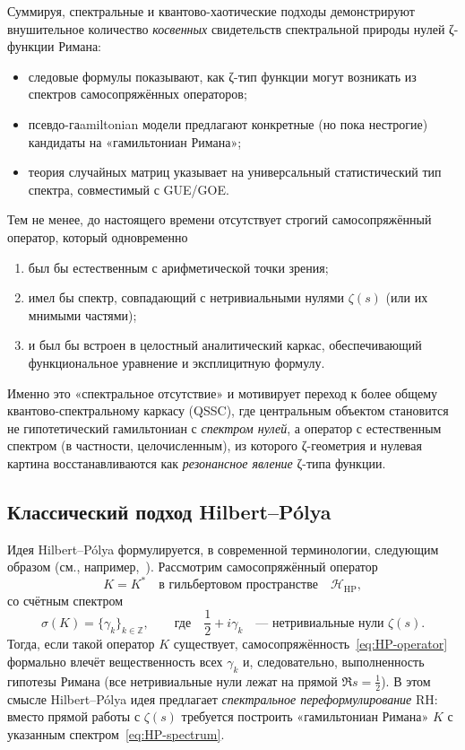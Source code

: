 \documentclass{article}
\numberwithin{equation}{section}
\theoremstyle{plain}
\theoremstyle{definition}
\theoremstyle{remark}
\begin{document}
\medskip

\noindent
Суммируя, спектральные и квантово-хаотические подходы демонстрируют внушительное количество \emph{косвенных} свидетельств спектральной природы нулей ζ-функции Римана:
\begin{itemize}
  \item следовые формулы показывают, как ζ-тип функции могут возникать из спектров самосопряжённых операторов;
  \item псевдо-гаamiltonian модели предлагают конкретные (но пока нестрогие) кандидаты на «гамильтониан Римана»;
  \item теория случайных матриц указывает на универсальный статистический тип спектра, совместимый с GUE/GOE.
\end{itemize}
Тем не менее, до настоящего времени отсутствует строгий самосопряжённый оператор, который одновременно
\begin{enumerate}[label=(\roman*), leftmargin=2.3em]
  \item был бы естественным с арифметической точки зрения;
  \item имел бы спектр, совпадающий с нетривиальными нулями $\zeta(s)$ (или их мнимыми частями);
  \item и был бы встроен в целостный аналитический каркас, обеспечивающий функциональное уравнение и эксплицитную формулу.
\end{enumerate}
Именно это «спектральное отсутствие» и мотивирует переход к более общему квантово-спектральному каркасу (QSSC), где центральным объектом становится не гипотетический гамильтониан с \emph{спектром нулей}, а оператор с естественным спектром (в частности, целочисленным), из которого ζ-геометрия и нулевая картина восстанавливаются как \emph{резонансное явление} ζ-типа функции.


\subsection{Классический подход Hilbert--Pólya}
\label{subsec:hilbert-polyaplan}

\noindent
Идея Hilbert--Pólya формулируется, в современной терминологии, следующим образом
(см., например,~\cite{Edwards1974,Conrey2003,Connes1999}).
Рассмотрим самосопряжённый оператор
\begin{equation}
K = K^\ast
\quad\text{в гильбертовом пространстве}\quad
\mathcal H_{\mathrm{HP}},
\label{eq:HP-operator}
\end{equation}
со счётным спектром
\begin{equation}
\sigma(K)
=
\{\gamma_k\}_{k\in\mathbb Z},
\qquad
\text{где}\quad
\frac12 + i\gamma_k
\quad\text{--- нетривиальные нули }\zeta(s).
\label{eq:HP-spectrum}
\end{equation}
Тогда, если такой оператор $K$ существует, самосопряжённость~\eqref{eq:HP-operator}
формально влечёт вещественность всех $\gamma_k$ и, следовательно, выполненность
гипотезы Римана (все нетривиальные нули лежат на прямой $\Re s = \tfrac12$). 
В этом смысле Hilbert--Pólya идея предлагает \emph{спектральное переформулирование} RH:
вместо прямой работы с $\zeta(s)$ требуется построить «гамильтониан Римана» $K$
с указанным спектром~\eqref{eq:HP-spectrum}.
\end{document}
